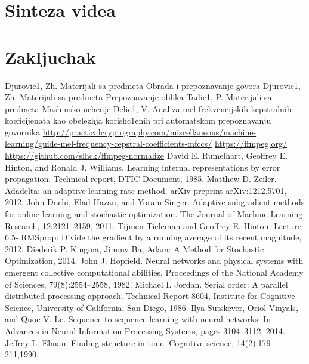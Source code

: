 \documentclass[a4paper, openany, oneside, 11pt]{book}
\begin{document}
\chapter{Sinteza videa}
\chapter{Zakljuchak}


\begin{thebibliography}{99}
Djurovic1, Zh. Materijali sa predmeta Obrada i prepoznavanje govora
Djurovic1, Zh. Materijali sa predmeta Prepoznavanje oblika
Tadic1, P. Materijali sa predmeta Mashinsko uchenje
Delic1, V. Analiza mel-frekvencijskih kepstralnih koeficijenata kao obelezhja korish\-c1enih pri automat\-skom prepoznavanju govornika
\selectfont
\url{http://practicalcryptography.com/miscellaneous/machine-learning/guide-mel-frequency-cepstral-coefficients-mfccs/}
\url{https://ffmpeg.org/}
\url{https://github.com/slhck/ffmpeg-normalize}
David E. Rumelhart, Geoffrey E. Hinton, and Ronald J. Williams. Learning
internal representations by error propagation. Technical report, DTIC Document, 1985.
Matthew D. Zeiler. Adadelta: an adaptive learning rate method. arXiv preprint arXiv:1212.5701, 2012.
John Duchi, Elad Hazan, and Yoram Singer. Adaptive subgradient methods for
online learning and stochastic optimization. The Journal of Machine Learning Research, 12:2121–2159, 2011.
Tijmen Tieleman and Geoffrey E. Hinton. Lecture 6.5- RMSprop: Divide
the gradient by a running average of its recent magnitude, 2012.
Diederik P. Kingma, Jimmy Ba, Adam: A Method for Stochastic Optimization, 2014.
John J. Hopfield. Neural networks and physical systems with emergent collective
computational abilities. Proceedings of the National Academy of Sciences, 79(8):2554–2558, 1982.
Michael I. Jordan. Serial order: A parallel distributed processing approach.
Technical Report 8604, Institute for Cognitive Science, University of California, San Diego, 1986.
Ilya Sutskever, Oriol Vinyals, and Quoc V. Le. Sequence to sequence learning
with neural networks. In Advances in Neural Information Processing Systems,
pages 3104–3112, 2014.
Jeffrey L. Elman. Finding structure in time. Cognitive science, 14(2):179–211,1990.

\end{thebibliography}
\end{document}
